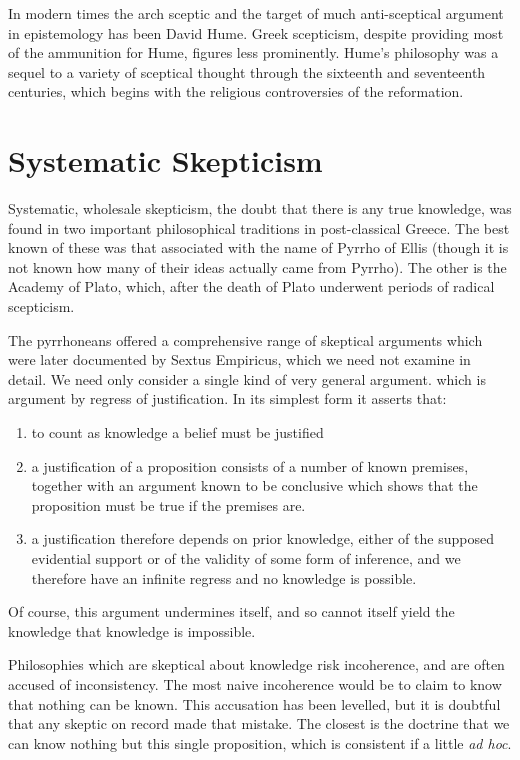 In modern times the arch sceptic and the target of much anti-sceptical
argument in epistemology has been David Hume. 
Greek scepticism, despite providing most of the ammunition for Hume,
figures less prominently. 
Hume's philosophy was a sequel to a variety of sceptical thought through
the sixteenth and seventeenth centuries, which begins with the
religious controversies of the reformation.  

\section{Systematic Skepticism}

Systematic, wholesale skepticism, the doubt that there is any
true knowledge, was found in two important philosophical traditions
in post-classical Greece.
The best known of these was that associated with the name of Pyrrho of
Ellis (though it is not known how many of their ideas actually came from Pyrrho).
The other is the Academy of Plato, which, after the  death of Plato
underwent periods of radical scepticism.

The pyrrhoneans offered a comprehensive range of skeptical arguments which were later documented by Sextus Empiricus, which we need not examine in detail.
We need only consider a single kind of very general argument. which is argument by regress of justification.
In its simplest form it asserts that:

\begin{enumerate}
\item to count as knowledge a belief must be justified
\item a justification of a proposition consists of a number of known premises, together with an argument known to be conclusive which shows that the proposition must be true if the premises are.
\item a justification therefore depends on prior knowledge, either of the supposed evidential support or of the validity of some form of inference, and we therefore have an infinite regress and no knowledge is possible.
\end{enumerate}

Of course, this argument undermines itself, and so cannot itself yield the knowledge that knowledge is impossible.

Philosophies which are skeptical about knowledge risk incoherence, and are often accused of inconsistency.
The most naive incoherence would be to claim to know that nothing can be known.
This accusation has been levelled, but it is doubtful that any skeptic on record made that mistake.
The closest is the doctrine that we can know nothing but this single proposition, which is consistent if a little {\it ad hoc}.

